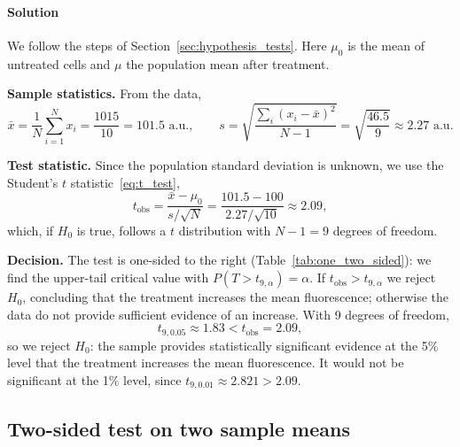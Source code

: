 \paragraph{Solution} We follow the steps of Section~\ref{sec:hypothesis_tests}. Here $\mu_0$ is the mean of untreated cells and $\mu$ the population mean after treatment.

\textbf{Sample statistics.} From the data,
\begin{equation*}
\bar{x} = \frac{1}{N}\sum_{i=1}^{N}x_i = \frac{1015}{10} = 101.5\text{ a.u.}, \qquad s = \sqrt{\frac{\sum_i(x_i - \bar{x})^2}{N - 1}} = \sqrt{\frac{46.5}{9}} \approx 2.27\text{ a.u.}
\end{equation*}

\textbf{Test statistic.} Since the population standard deviation is unknown, we use the Student's $t$ statistic~\eqref{eq:t_test},
\begin{equation*}
t_{\text{obs}} = \frac{\bar{x} - \mu_0}{s/\sqrt{N}} = \frac{101.5 - 100}{2.27/\sqrt{10}} \approx 2.09,
\end{equation*}
which, if $H_0$ is true, follows a $t$ distribution with $N - 1 = 9$ degrees of freedom.

\textbf{Decision.} The test is one-sided to the right (Table~\ref{tab:one_two_sided}): we find the upper-tail critical value with $P(T > t_{9,\alpha}) = \alpha$. If $t_{\text{obs}} > t_{9,\alpha}$ we reject $H_0$, concluding that the treatment increases the mean fluorescence; otherwise the data do not provide sufficient evidence of an increase. With 9 degrees of freedom,
\begin{equation*}
t_{9,0.05} \approx 1.83 < t_{\text{obs}} = 2.09,
\end{equation*}
so we reject $H_0$: the sample provides statistically significant evidence at the 5\% level that the treatment increases the mean fluorescence. It would not be significant at the 1\% level, since $t_{9,0.01} \approx 2.821 > 2.09$.

\subsection{Two-sided test on two sample means}
\label{ex:two_sided_test}

